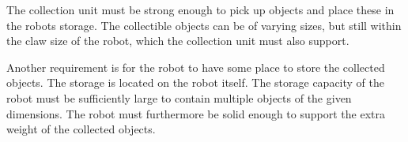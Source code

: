 The collection unit must be strong enough to pick up objects and place these in the robots storage. The collectible objects can be of varying sizes, but still within the claw size of the robot, which the collection unit must also support.

Another requirement is for the robot to have some place to store the collected objects. The storage is located on the robot itself. The storage capacity of the robot must be sufficiently large to contain multiple objects of the given dimensions. The robot must furthermore be solid enough to support the extra weight of the collected objects. 




